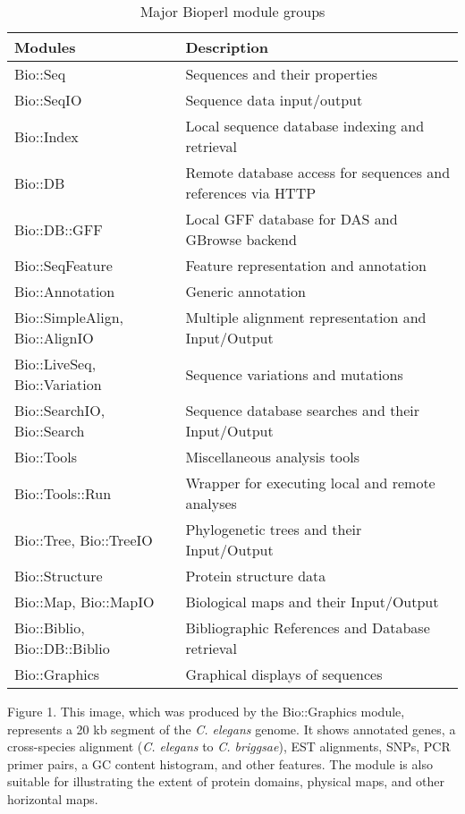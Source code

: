 \documentclass[12pt]{article}
\begin{document}
\newpage

\pagestyle{fancy}
\fancyhf{}
\renewcommand{\headrulewidth}{0pt}


\begin{table}[h]
\begin{tabular}{|l|l|}
\hline
\textbf{Modules} & \textbf{Description} \\
\hline
Bio::Seq &  Sequences and their properties \\
Bio::SeqIO & Sequence data input/output \\
Bio::Index & Local sequence database indexing and retrieval \\ 
Bio::DB & Remote database access for sequences and references via HTTP \\
Bio::DB::GFF & Local GFF database for DAS and GBrowse backend \\
Bio::SeqFeature & Feature representation and annotation \\
Bio::Annotation & Generic annotation \\
Bio::SimpleAlign, Bio::AlignIO  & Multiple alignment representation
and Input/Output \\
Bio::LiveSeq, Bio::Variation & Sequence variations and mutations \\
Bio::SearchIO, Bio::Search  & Sequence database searches and their Input/Output \\
Bio::Tools &  Miscellaneous analysis tools \\
Bio::Tools::Run &  Wrapper for executing local and remote analyses \\
Bio::Tree, Bio::TreeIO & Phylogenetic trees and their Input/Output  \\
Bio::Structure & Protein structure data \\
Bio::Map, Bio::MapIO & Biological maps and their Input/Output \\
Bio::Biblio, Bio::DB::Biblio & Bibliographic References and Database
retrieval \\ 
Bio::Graphics & Graphical displays of sequences \\
\hline
\end{tabular}
\caption{Major Bioperl module groups}
\label{tab:modules}
\end{table}

\newpage


Figure 1. This image, which was produced by the Bio::Graphics module,
represents a 20 kb segment of the \textit{C. elegans} genome. It shows
annotated genes, a cross-species alignment (\textit{C. elegans} to
\textit{C. briggsae}), EST alignments, SNPs, PCR primer pairs, a GC content
histogram, and other features.  The module is also suitable for
illustrating the extent of protein domains, physical maps, and other
horizontal maps.
\end{document}
